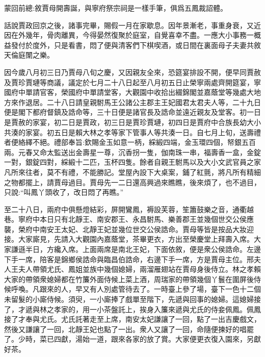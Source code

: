 

\begin{parag}
    \begin{note}蒙回前總:敘賈母開壽誕，與寧府祭宗祠是一樣手筆，俱爲五鳳裁詔體。\end{note}
\end{parag}


\begin{parag}
    話說賈政回京之後，諸事完畢，賜假一月在家歇息。因年景漸老，事重身衰，又近因在外幾年，骨肉離異，今得晏然復聚於庭室，自覺喜幸不盡。一應大小事務一概益發付於度外，只是看書，悶了便與清客們下棋喫酒，或日間在裏面母子夫妻共敘天倫庭闈之樂。
\end{parag}


\begin{parag}
    因今歲八月初三日乃賈母八旬之慶，又因親友全來，恐筵宴排設不開，便早同賈赦及賈珍賈璉等商議，議定於七月二十八日起至八月初五日止榮寧兩處齊開筵宴，寧國府中單請官客，榮國府中單請堂客，大觀園中收拾出綴錦閣並嘉蔭堂等幾處大地方來作退居。二十八日請皇親駙馬王公諸公主郡主王妃國君太君夫人等，二十九日便是閣下都府督鎮及誥命等，三十日便是諸官長及誥命並遠近親友及堂客。初一日是賈赦的家宴，初二日是賈政，初三日是賈珍賈璉，初四日是賈府中合族長幼大小共湊的家宴。初五日是賴大林之孝等家下管事人等共湊一日。自七月上旬，送壽禮者便絡繹不絕。禮部奉旨:欽賜金玉如意一柄，綵緞四端，金玉環四個，帑銀五百兩。元春又命太監送出金壽星一尊，沉香拐一隻，伽南珠一串，福壽香一盒，金錠一對，銀錠四對，綵緞十二匹，玉杯四隻。餘者自親王駙馬以及大小文武官員之家凡所來往者，莫不有禮，不能勝記。堂屋內設下大桌案，鋪了紅氈，將凡所有精細之物都擺上，請賈母過目。賈母先一二日還高興過來瞧瞧，後來煩了，也不過目，只說:“叫鳳丫頭收了，改日悶了再瞧。”
\end{parag}


\begin{parag}
    至二十八日，兩府中俱懸燈結彩，屏開鸞鳳，褥設芙蓉，笙簫鼓樂之音，通衢越巷。寧府中本日只有北靜王、南安郡王、永昌駙馬、樂善郡王並幾個世交公侯應襲，榮府中南安王太妃、北靜王妃並幾位世交公侯誥命。賈母等皆是按品大妝迎接。大家廝見，先請入大觀園內嘉蔭堂，茶畢更衣，方出至榮慶堂上拜壽入席。大家謙遜半日，方纔入席。上面兩席是南北王妃，下面依敘，便是衆公侯誥命。左邊下手一席，陪客是錦鄉侯誥命與臨昌伯誥命，右邊下手一席，方是賈母主位。邢夫人王夫人帶領尤氏、鳳姐並族中幾個媳婦，兩溜雁翅站在賈母身後侍立。林之孝賴大家的帶領衆媳婦都在竹簾外面侍候上菜上酒，周瑞家的帶領幾個丫鬟在圍屏後侍候呼喚。凡跟來的人，早又有人別處管待去了。一時臺上參了場，臺下一色十二個未留髮的小廝侍候。須臾，一小廝捧了戲單至階下，先遞與回事的媳婦。這媳婦接了，才遞與林之孝家的，用一小茶盤託上，挨身入簾來遞與尤氏的侍妾佩鳳。佩鳳接了才奉與尤氏。尤氏託著走至上席，南安太妃謙讓了一回，點了一出吉慶戲文，然後又謙讓了一回，北靜王妃也點了一出。衆人又讓了一回，命隨便揀好的唱罷了。少時，菜已四獻，湯始一道，跟來各家的放了賞。大家便更衣復入園來，另獻好茶。
\end{parag}


